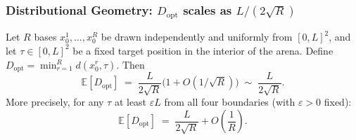 \subsubsection{Distributional Geometry: \texorpdfstring{$D_{\mathrm{opt}}$}{D\_opt} scales as \texorpdfstring{$L/(2\sqrt{R})$}{L/(2sqrt(R))}}

\begin{lemma}\label{lem:dopt}
Let $R$ bases $x_0^1,\ldots,x_0^R$ be drawn independently and uniformly
from $[0,L]^2$, and let $\tau \in [0,L]^2$ be a fixed target position
in the interior of the arena.
Define $D_{\mathrm{opt}} = \min_{r=1}^{R} d(x_0^r, \tau)$.
Then
\begin{equation}\label{eq:dopt-scaling}
  \mathbb{E}[D_{\mathrm{opt}}]
  \;=\; \frac{L}{2\sqrt{R}}\bigl(1 + O(1/\sqrt{R})\bigr)
  \;\sim\; \frac{L}{2\sqrt{R}}.
\end{equation}
More precisely, for any $\tau$ at least $\varepsilon L$ from all four
boundaries (with $\varepsilon > 0$ fixed):
\begin{equation}\label{eq:dopt-exact}
  \mathbb{E}[D_{\mathrm{opt}}]
  \;=\; \frac{L}{2\sqrt{R}} + O\!\left(\frac{1}{R}\right).
\end{equation}
\end{lemma}


